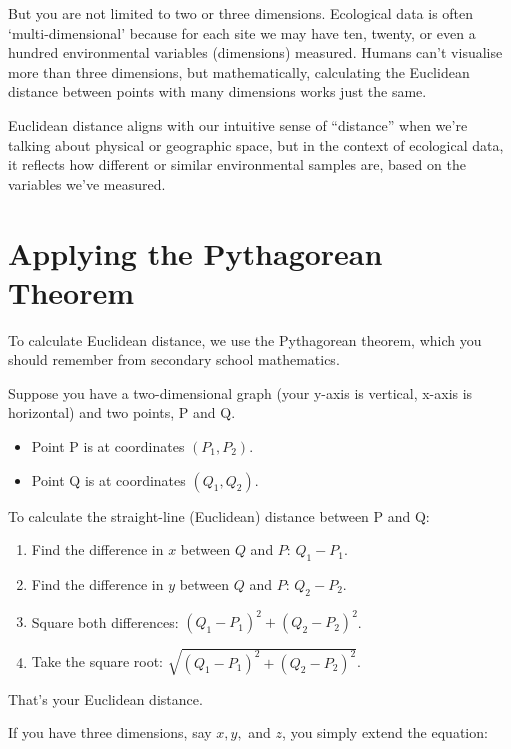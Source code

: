 \documentclass[
  12pt,
]{book}
\providecommand{\tightlist}{%
  \setlength{\itemsep}{0pt}\setlength{\parskip}{0pt}}
\begin{document}
But you are not limited to two or three dimensions. Ecological data is
often `multi-dimensional' because for each site we may have ten, twenty,
or even a hundred environmental variables (dimensions) measured. Humans
can't visualise more than three dimensions, but mathematically,
calculating the Euclidean distance between points with many dimensions
works just the same.

Euclidean distance aligns with our intuitive sense of ``distance'' when
we're talking about physical or geographic space, but in the context of
ecological data, it reflects how different or similar environmental
samples are, based on the variables we've measured.

\section{Applying the Pythagorean
Theorem}\label{applying-the-pythagorean-theorem}

To calculate Euclidean distance, we use the Pythagorean theorem, which
you should remember from secondary school mathematics.

Suppose you have a two-dimensional graph (your y-axis is vertical,
x-axis is horizontal) and two points, P and Q.

\begin{itemize}
\tightlist
\item
  Point P is at coordinates \((P_1, P_2)\).
\item
  Point Q is at coordinates \((Q_1, Q_2)\).
\end{itemize}

To calculate the straight-line (Euclidean) distance between P and Q:

\begin{enumerate}
\def\labelenumi{\arabic{enumi}.}
\tightlist
\item
  Find the difference in \(x\) between \(Q\) and \(P\): \(Q_1 - P_1\).
\item
  Find the difference in \(y\) between \(Q\) and \(P\): \(Q_2 - P_2\).
\item
  Square both differences: \((Q_1 - P_1)^2 + (Q_2 - P_2)^2\).
\item
  Take the square root: \(\sqrt{(Q_1 - P_1)^2 + (Q_2 - P_2)^2}\).
\end{enumerate}

That's your Euclidean distance.

If you have three dimensions, say \(x, y,\) and \(z\), you simply extend
the equation:
\end{document}

